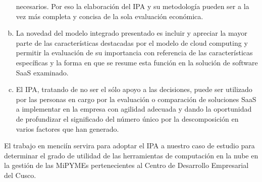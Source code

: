 \begin{enumerate}[a.]
            necesarios. Por eso la elaboración del IPA y su metodología pueden
            ser a la vez más completa y concisa de la sola evaluación económica.
      \item La novedad del modelo integrado presentado es incluir y apreciar la
            mayor parte de las características destacadas por el modelo de cloud
            computing y permitir la evaluación de su importancia con referencia
            de las características específicas y la forma en que se resume esta
            función en la solución de software SaaS examinado.
      \item El IPA, tratando de no ser el sólo apoyo a las decisiones, puede ser
            utilizado por las personas en cargo por la evaluación o comparación de
            soluciones SaaS a implementar en la empresa con agilidad adecuada y
            dando la oportunidad de profundizar el significado del número único
            por la descomposición en varios factores que han generado.
\end{enumerate}

El trabajo en menciín servira para adoptar el IPA a nuestro caso de estudio para
determinar el grado de utilidad de las herramientas de computación en la nube
en la gestión de las MiPYMEs pertenecientes al Centro de Desarrollo Empresarial
del Cusco.

